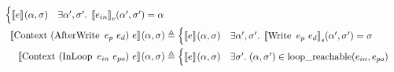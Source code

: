 \begin{align*}
\begin{cases}
  \denotef{e}{\targ,\tmem} & \exists \targ', \tmem' . \; \denotefv{e_{in}}{\targ',\tmem'} = \targ
\end{cases}\\
%
\denotef{\bop{Context}{(\bop{AfterWrite}{e_p}{e_d})}{e}}{\targ,\tmem} &\eqdef
\begin{cases}
  \denotef{e}{\targ,\tmem} & \exists \targ', \tmem' . \; \denotefs{\bop{Write}{e_p}{e_d}}{\targ',\tmem'} = \tmem
\end{cases}\\
%
\denotef{\bop{Context}{(\bop{InLoop}{e_{in}}{e_{po}})}{e}}{\targ,\tmem} &\eqdef
\begin{cases}
  \denotef{e}{\targ,\tmem} &
    \exists  \tmem' . \; (\targ,\tmem') \in  \operatorname{loop\_reachable}(e_{in},e_{po})
\end{cases}
\end{align*}
